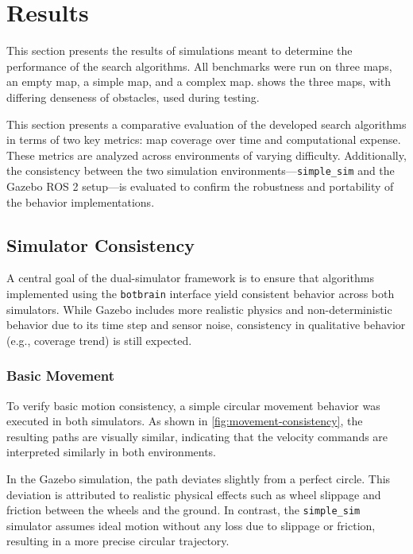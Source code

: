 \section{Results}
\label{sec:results}
This section presents the results of simulations meant to determine the performance of the search algorithms. All benchmarks were run on three maps, an empty map, a simple map, and a complex map.  shows the three maps, with differing denseness of obstacles, used during testing.

This section presents a comparative evaluation of the developed search algorithms in terms of two key metrics: map coverage over time and computational expense. These metrics are analyzed across environments of varying difficulty. 
Additionally, the consistency between the two simulation environments—\texttt{simple\_sim} and the Gazebo ROS 2 setup—is evaluated to confirm the robustness and portability of the behavior implementations.


\subsection{Simulator Consistency}
A central goal of the dual-simulator framework is to ensure that algorithms implemented using the \texttt{botbrain} interface yield consistent behavior across both simulators. While Gazebo includes more realistic physics and non-deterministic behavior due to its time step and sensor noise, consistency in qualitative behavior (e.g., coverage trend) is still expected.


\subsubsection{Basic Movement}
To verify basic motion consistency, a simple circular movement behavior was executed in both simulators. As shown in \cref{fig:movement-consistency}, the resulting paths are visually similar, indicating that the velocity commands are interpreted similarly in both environments.

In the Gazebo simulation, the path deviates slightly from a perfect circle. This deviation is attributed to realistic physical effects such as wheel slippage and friction between the wheels and the ground. In contrast, the \texttt{simple\_sim} simulator assumes ideal motion without any loss due to slippage or friction, resulting in a more precise circular trajectory.\\


